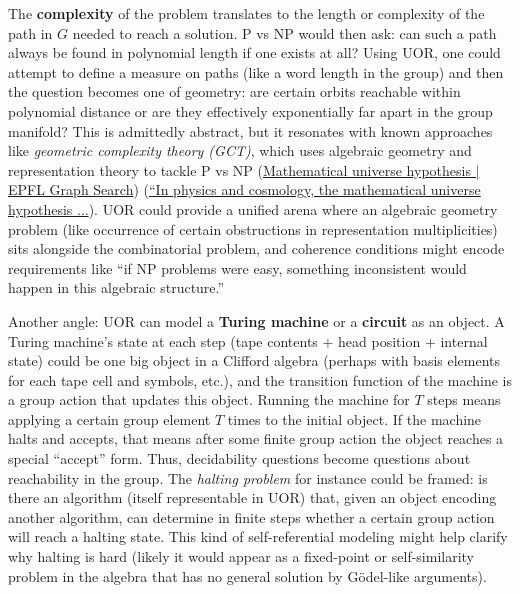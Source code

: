 \documentclass[12pt]{article}
\begin{document}
The \textbf{complexity} of the problem translates to the length or complexity of the path in $G$ needed to reach a solution. P vs NP would then ask: can such a path always be found in polynomial length if one exists at all? Using UOR, one could attempt to define a measure on paths (like a word length in the group) and then the question becomes one of geometry: are certain orbits reachable within polynomial distance or are they effectively exponentially far apart in the group manifold? This is admittedly abstract, but it resonates with known approaches like \emph{geometric complexity theory (GCT)}, which uses algebraic geometry and representation theory to tackle P vs NP (\href{https://graphsearch.epfl.ch/concept/2148329#:~:text=Mathematical%20universe%20hypothesis%20,%28TOE}{Mathematical universe hypothesis | EPFL Graph Search}) (\href{https://www.threads.net/@harpercarrollai/post/DB9ysvkyOMl#:~:text=%E2%80%9CIn%20physics%20and%20cosmology%2C%20the,proposed%20by%20cosmologist%20Max}{“In physics and cosmology, the mathematical universe hypothesis ...}). UOR could provide a unified arena where an algebraic geometry problem (like occurrence of certain obstructions in representation multiplicities) sits alongside the combinatorial problem, and coherence conditions might encode requirements like ``if NP problems were easy, something inconsistent would happen in this algebraic structure.''

\medskip

Another angle: UOR can model a \textbf{Turing machine} or a \textbf{circuit} as an object. A Turing machine’s state at each step (tape contents + head position + internal state) could be one big object in a Clifford algebra (perhaps with basis elements for each tape cell and symbols, etc.), and the transition function of the machine is a group action that updates this object. Running the machine for $T$ steps means applying a certain group element $T$ times to the initial object. If the machine halts and accepts, that means after some finite group action the object reaches a special ``accept'' form. Thus, decidability questions become questions about reachability in the group. The \emph{halting problem} for instance could be framed: is there an algorithm (itself representable in UOR) that, given an object encoding another algorithm, can determine in finite steps whether a certain group action will reach a halting state. This kind of self-referential modeling might help clarify why halting is hard (likely it would appear as a fixed-point or self-similarity problem in the algebra that has no general solution by Gödel-like arguments).
\end{document}

